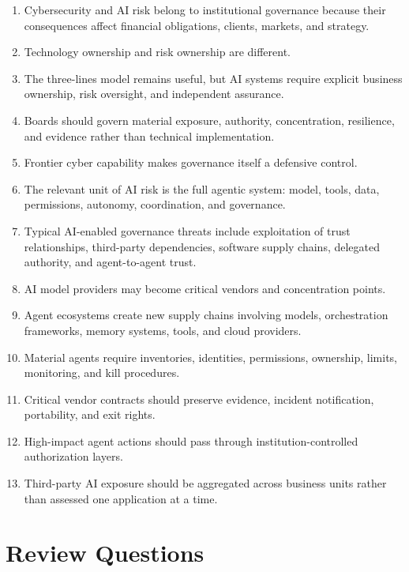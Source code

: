 \begin{enumerate}
    \item Cybersecurity and AI risk belong to institutional governance because their consequences affect financial obligations, clients, markets, and strategy.
    \item Technology ownership and risk ownership are different.
    \item The three-lines model remains useful, but AI systems require explicit business ownership, risk oversight, and independent assurance.
    \item Boards should govern material exposure, authority, concentration, resilience, and evidence rather than technical implementation.
    \item Frontier cyber capability makes governance itself a defensive control.
    \item The relevant unit of AI risk is the full agentic system: model, tools, data, permissions, autonomy, coordination, and governance.
    \item Typical AI-enabled governance threats include exploitation of trust relationships, third-party dependencies, software supply chains, delegated authority, and agent-to-agent trust.
    \item AI model providers may become critical vendors and concentration points.
    \item Agent ecosystems create new supply chains involving models, orchestration frameworks, memory systems, tools, and cloud providers.
    \item Material agents require inventories, identities, permissions, ownership, limits, monitoring, and kill procedures.
    \item Critical vendor contracts should preserve evidence, incident notification, portability, and exit rights.
    \item High-impact agent actions should pass through institution-controlled authorization layers.
    \item Third-party AI exposure should be aggregated across business units rather than assessed one application at a time.
\end{enumerate}

\section{Review Questions}

